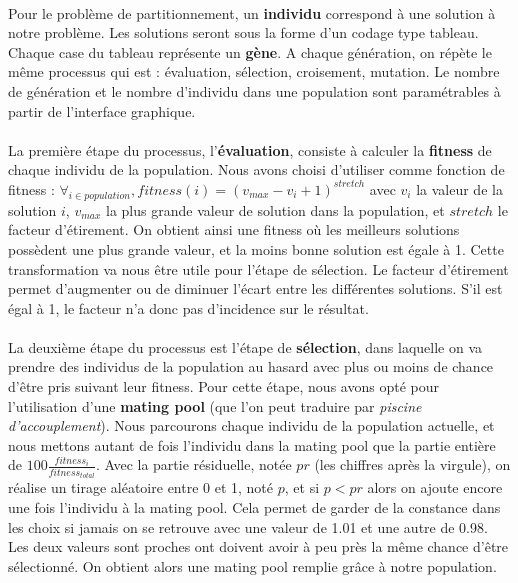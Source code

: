 \documentclass[12pt]{article}
\begin{document}
\paragraph{}Pour le problème de partitionnement, un \textbf{individu} correspond à une solution à notre problème. Les solutions seront sous la forme d'un codage type tableau. Chaque case du tableau représente un \textbf{gène}. A chaque génération, on répète le même processus qui est : évaluation, sélection, croisement, mutation. Le nombre de génération et le nombre d'individu dans une population sont paramétrables à partir de l'interface graphique.

\paragraph{}La première étape du processus, l'\textbf{évaluation}, consiste à calculer la \textbf{fitness} de chaque individu de la population. Nous avons choisi d'utiliser comme fonction de fitness : $\forall_{i \in population}, fitness(i) = \left(v_{max} - v_i + 1\right)^{stretch}$ avec $v_i$ la valeur de la solution $i$, $v_{max}$ la plus grande valeur de solution dans la population, et $stretch$ le facteur d'étirement. On obtient ainsi une fitness où les meilleurs solutions possèdent une plus grande valeur, et la moins bonne solution est égale à 1. Cette transformation va nous être utile pour l'étape de sélection. Le facteur d'étirement permet d'augmenter ou de diminuer l'écart entre les différentes solutions. S'il est égal à 1, le facteur n'a donc pas d'incidence sur le résultat.

\paragraph{}La deuxième étape du processus est l'étape de \textbf{sélection}, dans laquelle on va prendre des individus de la population au hasard avec plus ou moins de chance d'être pris suivant leur fitness. Pour cette étape, nous avons opté pour l'utilisation d'une \textbf{mating pool} (que l'on peut traduire par \textit{piscine d'accouplement}). Nous parcourons chaque individu de la population actuelle, et nous mettons autant de fois l'individu dans la mating pool que la partie entière de $100\frac{fitness_i}{fitness_{total}}$. Avec la partie résiduelle, notée $pr$ (les chiffres après la virgule), on réalise un tirage aléatoire entre 0 et 1, noté $p$, et si $p < pr$ alors on ajoute encore une fois l'individu à la mating pool. Cela permet de garder de la constance dans les choix si jamais on se retrouve avec une valeur de 1.01 et une autre de 0.98. Les deux valeurs sont proches ont doivent avoir à peu près la même chance d'être sélectionné. On obtient alors une mating pool remplie grâce à notre population.
\end{document}
